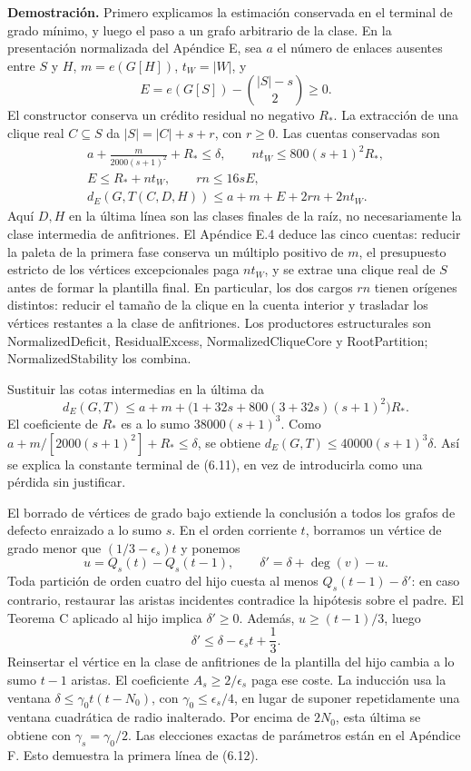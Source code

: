 \documentclass[spanish,11pt,a4paper]{article}
\begin{document}
\textbf{Demostración.} Primero explicamos la estimación conservada en el terminal de grado mínimo, y luego el paso a un grafo arbitrario de la clase. En la presentación normalizada del Apéndice E, sea \(a\) el número de enlaces ausentes entre \(S\) y \(H\), \(m=e(G[H])\), \(t_W=|W|\), y \[
E=e(G[S])-\binom{|S|-s}{2}\ge0.
\] El constructor conserva un crédito residual no negativo \(R_*\). La extracción de una clique real \(C\subseteq S\) da \(|S|=|C|+s+r\), con \(r\ge0\). Las cuentas conservadas son \[
\begin{gathered}
a+\frac{m}{2000(s+1)^2}+R_*\le\delta,\qquad
nt_W\le800(s+1)^2R_*,\\
E\le R_*+nt_W,\qquad rn\le16sE,\\
d_E(G,T(C,D,H))\le a+m+E+2rn+2nt_W.
\end{gathered}
\tag{6.14}
\] Aquí \(D,H\) en la última línea son las clases finales de la raíz, no necesariamente la clase intermedia de anfitriones. El Apéndice E.4 deduce las cinco cuentas: reducir la paleta de la primera fase conserva un múltiplo positivo de \(m\), el presupuesto estricto de los vértices excepcionales paga \(nt_W\), y se extrae una clique real de \(S\) antes de formar la plantilla final. En particular, los dos cargos \(rn\) tienen orígenes distintos: reducir el tamaño de la clique en la cuenta interior y trasladar los vértices restantes a la clase de anfitriones. Los productores estructurales son NormalizedDeficit, ResidualExcess, NormalizedCliqueCore y RootPartition; NormalizedStability los combina.

Sustituir las cotas intermedias en la última da \[
d_E(G,T)\le a+m+
\bigl(1+32s+800(3+32s)(s+1)^2\bigr)R_*.
\] El coeficiente de \(R_*\) es a lo sumo \(38000(s+1)^3\). Como \(a+m/[2000(s+1)^2]+R_*\le\delta\), se obtiene \(d_E(G,T)\le40000(s+1)^3\delta\). Así se explica la constante terminal de (6.11), en vez de introducirla como una pérdida sin justificar.

El borrado de vértices de grado bajo extiende la conclusión a todos los grafos de defecto enraizado a lo sumo \(s\). En el orden corriente \(t\), borramos un vértice de grado menor que \((1/3-\epsilon_s)t\) y ponemos \[
u=Q_s(t)-Q_s(t-1),\qquad
\delta'=\delta+\deg(v)-u.
\tag{6.15}
\] Toda partición de orden cuatro del hijo cuesta al menos \(Q_s(t-1)-\delta'\): en caso contrario, restaurar las aristas incidentes contradice la hipótesis sobre el padre. El Teorema C aplicado al hijo implica \(\delta'\ge0\). Además, \(u\ge(t-1)/3\), luego \[
\delta'\le\delta-\epsilon_s t+\frac13.
\] Reinsertar el vértice en la clase de anfitriones de la plantilla del hijo cambia a lo sumo \(t-1\) aristas. El coeficiente \(A_s\ge2/\epsilon_s\) paga ese coste. La inducción usa la ventana \(\delta\le\gamma_0t(t-N_0)\), con \(\gamma_0\le\epsilon_s/4\), en lugar de suponer repetidamente una ventana cuadrática de radio inalterado. Por encima de \(2N_0\), esta última se obtiene con \(\gamma_s=\gamma_0/2\). Las elecciones exactas de parámetros están en el Apéndice F. Esto demuestra la primera línea de (6.12).
\end{document}
